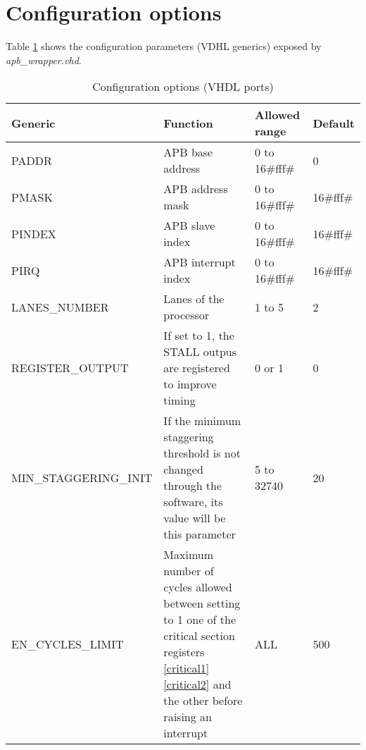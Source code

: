 \section{Configuration options}
\label{confg_chap}
Table \ref{generics} shows the configuration parameters (VDHL generics) exposed by \textit{apb\_wrapper.vhd}. 
\\
\begin{table}[H]
	\caption{Configuration options (VHDL ports)}
	\label{generics}
	\centering
	\begin{small}
		\begin{tabular}{|l|p{6cm}|l|l|}
			\hline
			\textbf{Generic} & \textbf{Function}  & \textbf{Allowed range}  & \textbf{Default}\\
			\hline
			PADDR  & APB base address &0 to 16\#fff\# & 0\\
			\hline
			PMASK  & APB address mask &0 to 16\#fff\# & 16\#fff\#\\
			\hline
			PINDEX & APB slave index &0 to 16\#fff\# & 16\#fff\#\\
			\hline
			PIRQ   & APB interrupt index &0 to 16\#fff\# & 16\#fff\#\\
			\hline
			LANES\_NUMBER & Lanes of the processor & 1 to 5 & 2\\
			\hline
			REGISTER\_OUTPUT & If set to 1, the STALL outpus are registered to improve timing & 0 or 1 & 0 \\
			\hline
			MIN\_STAGGERING\_INIT & If the minimum staggering threshold is not changed through the software, its value will be this parameter& 5 to 32740 & 20 \\
			\hline
                        EN\_CYCLES\_LIMIT & Maximum number of cycles allowed between setting to 1 one of the critical section registers \ref{critical1} \ref{critical2} and the other before raising an interrupt & ALL & 500 \\
			\hline
		\end{tabular}
	\end{small}
\end{table}

\hspace{2cm}
